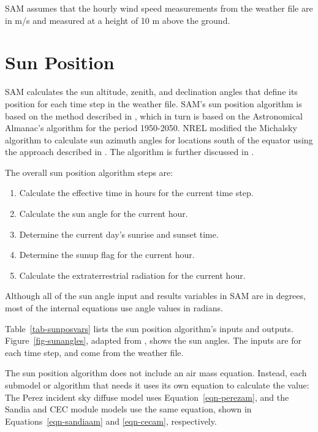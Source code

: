 \documentclass[12pt,letterpaper]{article}
\begin{document}
SAM assumes that the hourly wind speed measurements from the weather file are in m/s and measured at a height of 10 m above the ground.

\chapter{Sun Position}\label{sec-sunposition}

SAM calculates the sun altitude, zenith, and declination angles that define its position for each time step in the weather file. SAM's sun position algorithm is based on the method described in \citet{michalsky1988}, which in turn is based on the Astronomical Almanac's algorithm for the period 1950-2050. NREL modified the Michalsky algorithm to calculate sun azimuth angles for locations south of the equator using the approach described in \citep{iqbal1983}. The algorithm is further discussed in \citet{stackoverflow2012}.

The overall sun position algorithm steps are:
\begin{enumerate}
\item Calculate the effective time in hours for the current time step.
\item Calculate the sun angle for the current hour.
\item Determine the current day's sunrise and sunset time.
\item Determine the sunup flag for the current hour.
\item Calculate the extraterrestrial radiation for the current hour.
\end{enumerate}

Although all of the sun angle input and results variables in SAM are in degrees, most of the internal equations use angle values in radians.

Table~\ref{tab-sunposvars} lists the sun position algorithm's inputs and outputs. Figure~\ref{fig-sunangles}, adapted from \citet{dunlap2007}, shows the sun angles. The inputs are for each time step, and come from the weather file. 

The sun position algorithm does not include an air mass equation. Instead, each submodel or algorithm that needs it uses its own equation to calculate the value: The Perez incident sky diffuse model uses Equation~\ref{eqn-perezam}, and the Sandia and CEC module models use the same equation, shown in Equations~\ref{eqn-sandiaam} and \ref{eqn-cecam}, respectively. 
\end{document}
